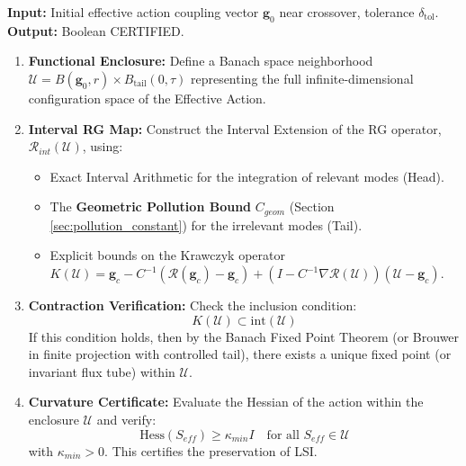 \begin{algorithm}
\caption{Rigorous RG Stability Check}
\textbf{Input:} Initial effective action coupling vector $\boldsymbol{g}_0$ near crossover, tolerance $\delta_{\text{tol}}$.
\textbf{Output:} Boolean CERTIFIED.

\begin{enumerate}
    \item \textbf{Functional Enclosure:} Define a Banach space neighborhood $\mathcal{U} = B(\boldsymbol{g}_0, r) \times B_{\text{tail}}(0, \tau)$ representing the full infinite-dimensional configuration space of the Effective Action.
    \item \textbf{Interval RG Map:} Construct the Interval Extension of the RG operator, $\mathcal{R}_{int}(\mathcal{U})$, using:
    \begin{itemize}
        \item Exact Interval Arithmetic for the integration of relevant modes (Head).
        \item The \textbf{Geometric Pollution Bound} $C_{geom}$ (Section \ref{sec:pollution_constant}) for the irrelevant modes (Tail).
        \item Explicit bounds on the Krawczyk operator $K(\mathcal{U}) = \boldsymbol{g}_c - C^{-1}(\mathcal{R}(\boldsymbol{g}_c) - \boldsymbol{g}_c) + (I - C^{-1}\nabla \mathcal{R}(\mathcal{U}))(\mathcal{U} - \boldsymbol{g}_c)$.
    \end{itemize}
    \item \textbf{Contraction Verification:} Check the inclusion condition:
    \begin{equation}
        K(\mathcal{U}) \subset \text{int}(\mathcal{U})
    \end{equation}
    If this condition holds, then by the Banach Fixed Point Theorem (or Brouwer in finite projection with controlled tail), there exists a unique fixed point (or invariant flux tube) within $\mathcal{U}$.
    \item \textbf{Curvature Certificate:} Evaluate the Hessian of the action within the enclosure $\mathcal{U}$ and verify:
    \begin{equation}
        \text{Hess}(S_{eff}) \ge \kappa_{min} I \quad \text{for all } S_{eff} \in \mathcal{U}
    \end{equation}
    with $\kappa_{min} > 0$. This certifies the preservation of LSI.
\end{enumerate}
\end{algorithm}

